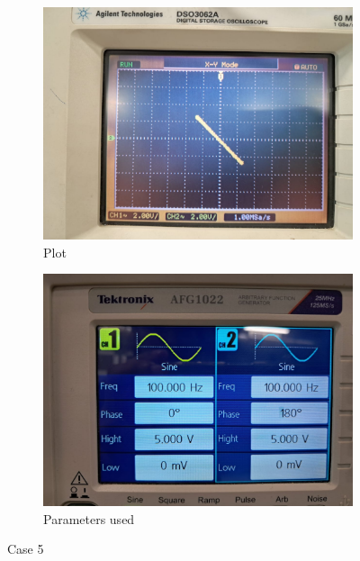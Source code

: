 \documentclass[a4paper,12pt]{article}
\begin{document}
\begin{figure}[htbp]
    \centering
    \begin{subfigure}[b]{0.45\textwidth}
        \centering
        \includegraphics[width=\linewidth]{figs/5/plot5.jpeg}
        \caption{Plot}
        \label{fig:image1}
    \end{subfigure}
    \hfill
    \begin{subfigure}[b]{0.45\textwidth}
        \centering
        \includegraphics[width=\linewidth]{figs/5/para5.jpeg}
        \caption{Parameters used}
        \label{fig:image2}
    \end{subfigure}
    \caption{Case 5}
    \label{fig:sidebyside}
\end{figure}
\end{document}
